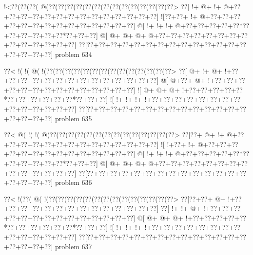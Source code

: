\vbox{\vbox{\goo
\- !<\0??(\0??(\0??(\- @(\0??(\0??(\0??(\0??(\0??(\0??(\0??(\0??(\0??(\0??(\0??(\0??(\0??(\0??>
\0??[\- !+\- @+\- !+\- @+\0??+\0??+\0??+\0??+\0??+\0??+\0??+\0??+\0??+\0??+\0??+\0??+\0??+\0??]
\- ![\0??+\0??+\- !+\- @+\0??+\0??+\0??+\0??+\0??+\0??+\0??+\0??+\0??+\0??+\0??+\0??+\0??+\0??]
\- @[\- !+\- !+\- !+\- @+\0??+\0??+\0??+\0??+\0??*\0??+\0??+\0??+\0??+\0??+\0??*\0??+\0??+\0??]
\- @[\- @+\- @+\- @+\- @+\0??+\0??+\0??+\0??+\0??+\0??+\0??+\0??+\0??+\0??+\0??+\0??+\0??+\0??]
\0??[\0??+\0??+\0??+\0??+\0??+\0??+\0??+\0??+\0??+\0??+\0??+\0??+\0??+\0??+\0??+\0??+\0??+\0??]
}
\hfil problem 634\hfil\break
}



\vbox{\vbox{\goo
\0??<\- !(\- !(\- @(\- !(\0??(\0??(\0??(\0??(\0??(\0??(\0??(\0??(\0??(\0??(\0??(\0??(\0??(\0??>
\0??[\- @+\- !+\- @+\- !+\0??+\0??+\0??+\0??+\0??+\0??+\0??+\0??+\0??+\0??+\0??+\0??+\0??+\0??]
\- @[\- @+\0??+\- @+\- !+\0??+\0??+\0??+\0??+\0??+\0??+\0??+\0??+\0??+\0??+\0??+\0??+\0??+\0??]
\- ![\- @+\- @+\- @+\- !+\0??+\0??+\0??+\0??+\0??*\0??+\0??+\0??+\0??+\0??+\0??*\0??+\0??+\0??]
\- ![\- !+\- !+\- !+\- !+\0??+\0??+\0??+\0??+\0??+\0??+\0??+\0??+\0??+\0??+\0??+\0??+\0??+\0??]
\0??[\0??+\0??+\0??+\0??+\0??+\0??+\0??+\0??+\0??+\0??+\0??+\0??+\0??+\0??+\0??+\0??+\0??+\0??]
}
\hfil problem 635\hfil\break
}



\vbox{\vbox{\goo
\0??<\- @(\- !(\- !(\- @(\0??(\0??(\0??(\0??(\0??(\0??(\0??(\0??(\0??(\0??(\0??(\0??(\0??(\0??>
\0??[\0??+\- @+\- !+\- @+\0??+\0??+\0??+\0??+\0??+\0??+\0??+\0??+\0??+\0??+\0??+\0??+\0??+\0??]
\- ![\- !+\0??+\- !+\- @+\0??+\0??+\0??+\0??+\0??+\0??+\0??+\0??+\0??+\0??+\0??+\0??+\0??+\0??]
\- @[\- !+\- !+\- !+\- @+\0??+\0??+\0??+\0??+\0??*\0??+\0??+\0??+\0??+\0??+\0??*\0??+\0??+\0??]
\- @[\- @+\- @+\- @+\- @+\0??+\0??+\0??+\0??+\0??+\0??+\0??+\0??+\0??+\0??+\0??+\0??+\0??+\0??]
\0??[\0??+\0??+\0??+\0??+\0??+\0??+\0??+\0??+\0??+\0??+\0??+\0??+\0??+\0??+\0??+\0??+\0??+\0??]
}
\hfil problem 636\hfil\break
}



\vbox{\vbox{\goo
\0??<\- !(\0??(\- @(\- !(\0??(\0??(\0??(\0??(\0??(\0??(\0??(\0??(\0??(\0??(\0??(\0??(\0??(\0??>
\0??[\0??+\0??+\- @+\- !+\0??+\0??+\0??+\0??+\0??+\0??+\0??+\0??+\0??+\0??+\0??+\0??+\0??+\0??]
\0??[\- !+\- !+\- @+\- !+\0??+\0??+\0??+\0??+\0??+\0??+\0??+\0??+\0??+\0??+\0??+\0??+\0??+\0??]
\- @[\- @+\- @+\- @+\- !+\0??+\0??+\0??+\0??+\0??*\0??+\0??+\0??+\0??+\0??+\0??*\0??+\0??+\0??]
\- ![\- !+\- !+\- !+\- !+\0??+\0??+\0??+\0??+\0??+\0??+\0??+\0??+\0??+\0??+\0??+\0??+\0??+\0??]
\0??[\0??+\0??+\0??+\0??+\0??+\0??+\0??+\0??+\0??+\0??+\0??+\0??+\0??+\0??+\0??+\0??+\0??+\0??]
}
\hfil problem 637\hfil\break
}



